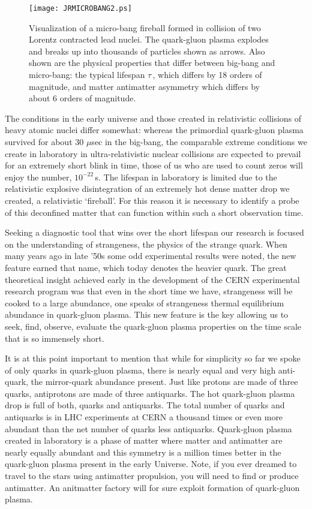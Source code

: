 \documentclass[twocolumn,showdate,prd,aps]{revtex4}
\begin{document}
\begin{figure}[!tbh]
\centerline{\texttt{[image: JRMICROBANG2.ps]}}
\caption{ %
Visualization  of a micro-bang fireball formed in collision of two Lorentz contracted lead nuclei.  The quark-gluon plasma explodes and breaks up into thousands of particles shown as arrows. Also shown  are the physical properties that differ between big-bang and micro-bang: the  
typical lifespan $\tau$\,, which differs by 18 orders of magnitude, and matter antimatter asymmetry which differs by about 6 orders of magnitude.\label{BangComp} 
}
\end{figure}
 
The conditions in the early universe and those created in relativistic collisions of heavy atomic nuclei differ somewhat: whereas the primordial quark-gluon plasma survived for about 30 $\mu$sec  in the big-bang, the comparable extreme conditions  we create in laboratory in ultra-relativistic nuclear collisions are  expected to prevail for an extremely short blink in time, those of us who are used to count zeros will enjoy the number,  $10^{-22}$\,s. The lifespan in laboratory is limited due to the relativistic explosive disintegration of an extremely hot dense matter drop we created, a relativistic `fireball'. For this reason it is necessary to identify a probe of this deconfined matter that can function within such a short observation time. 

Seeking a diagnostic tool that wins over the short lifespan our research is focused on the understanding of strangeness, the physics of the strange quark. When many years ago in late '50s  some odd experimental results were noted, the new feature  earned that name, which today denotes the  heavier quark.  The great theoretical insight achieved early in the development of the CERN experimental research program was that even in the short time we have,  strangeness will be cooked to a large abundance, one speaks of strangeness thermal equilibrium abundance in quark-gluon plasma. This new feature is the key allowing us to seek, find, observe, evaluate the quark-gluon plasma properties on the time scale that is so immensely short. 

It is at this point important to mention that while for simplicity so far we spoke of only quarks in quark-gluon plasma, there is nearly equal and very high anti-quark, the mirror-quark abundance present. Just like protons are made of three quarks, antiprotons are made of three antiquarks. The hot quark-gluon plasma drop is full of both, quarks and antiquarks.  The total number of quarks and antiquarks is in LHC experiments at CERN a thousand times or even more abundant than the net number of quarks less antiquarks.  Quark-gluon plasma created in laboratory is a phase of matter where matter and antimatter are nearly equally abundant and this symmetry is a million times better in the quark-gluon plasma present in the early Universe. Note, if you ever dreamed to travel to the stars using antimatter propulsion, you will need to find or produce antimatter. An anitmatter factory   will for sure exploit formation of quark-gluon plasma.
\end{document}
